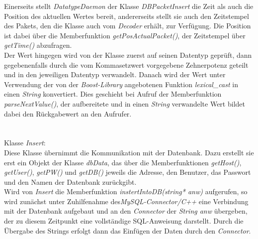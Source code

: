 \documentclass[fontsize = 12pt, paper = a4]{scrreprt}
\begin{document}
Einerseits stellt \textit{DatatypeDaemon} der Klasse \textit{DBPacketInsert} die Zeit als auch die Position des aktuellen Wertes bereit, andererseits stellt sie auch den Zeitstempel des Pakets, den die Klasse auch vom \textit{Decoder} erhält, zur Verfügung. Die Position ist dabei über die Memberfunktion \textit{getPosActualPacket()}, der Zeitstempel über \textit{getTime()} abzufragen.\\
Der Wert hingegen wird von der Klasse zuerst auf seinen Datentyp geprüft, dann gegebenenfalls durch die vom Kommasetzwert vorgegebene Zehnerpotenz geteilt und in den jeweiligen Datentyp verwandelt. Danach wird der Wert unter Verwendung der von der \textit{Boost-Library} angebotenen Funktion \textit{lexical\_cast} in einen \textit{String} konvertiert. Dies geschieht bei Aufruf der Memberfunktion \textit{parseNextValue()}, der aufbereitete und in einen \textit{String} verwandelte Wert bildet dabei den Rückgabewert an den Aufrufer.\\
\\
\\
Klasse \textit{Insert}:\\
Diese Klasse übernimmt die Kommunikation mit der Datenbank. Dazu erstellt sie erst ein Objekt der Klasse \textit{dbData}, das über die Memberfunktionen \textit{getHost()}, \textit{getUser()}, \textit{getPW()} und \textit{getDB()} jeweils die Adresse, den Benutzer, das Passwort und den Namen der Datenbank zurückgibt.\\
Wird von \textit{Insert} die Memberfunktion \textit{instertIntoDB(string* anw)} aufgerufen, so wird zunächst unter Zuhilfenahme des\textit{MySQL-Connector/C++} eine Verbindung mit der Datenbank aufgebaut und an den \textit{Connector} der \textit{String anw} übergeben, der zu diesem Zeitpunkt eine vollständige SQL-Anweisung darstellt. Durch die Übergabe des Strings erfolgt dann das Einfügen der Daten durch den \textit{Connector}.









\end{document}
